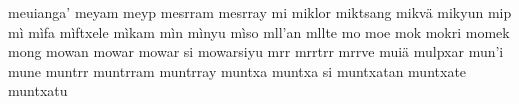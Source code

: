 meuianga'\hspace{2mm}
meyam\hspace{2mm}
meyp\hspace{2mm}
mesrram\hspace{2mm}
mesrray\hspace{2mm}
mi\hspace{2mm}
miklor\hspace{2mm}
miktsang\hspace{2mm}
mikvä\hspace{2mm}
mikyun\hspace{2mm}
mip\hspace{2mm}
mì\hspace{2mm}
mìfa\hspace{2mm}
mìftxele\hspace{2mm}
mìkam\hspace{2mm}
mìn\hspace{2mm}
mìnyu\hspace{2mm}
mìso\hspace{2mm}
mll'an\hspace{2mm}
mllte\hspace{2mm}
mo\hspace{2mm}
moe\hspace{2mm}
mok\hspace{2mm}
mokri\hspace{2mm}
momek\hspace{2mm}
mong\hspace{2mm}
mowan\hspace{2mm}
mowar\hspace{2mm}
mowar si\hspace{2mm}
mowarsiyu\hspace{2mm}
mrr\hspace{2mm}
mrrtrr\hspace{2mm}
mrrve\hspace{2mm}
muiä\hspace{2mm}
mulpxar\hspace{2mm}
mun'i\hspace{2mm}
mune\hspace{2mm}
muntrr\hspace{2mm}
muntrram\hspace{2mm}
muntrray\hspace{2mm}
muntxa\hspace{2mm}
muntxa si\hspace{2mm}
muntxatan\hspace{2mm}
muntxate\hspace{2mm}
muntxatu\hspace{2mm}
